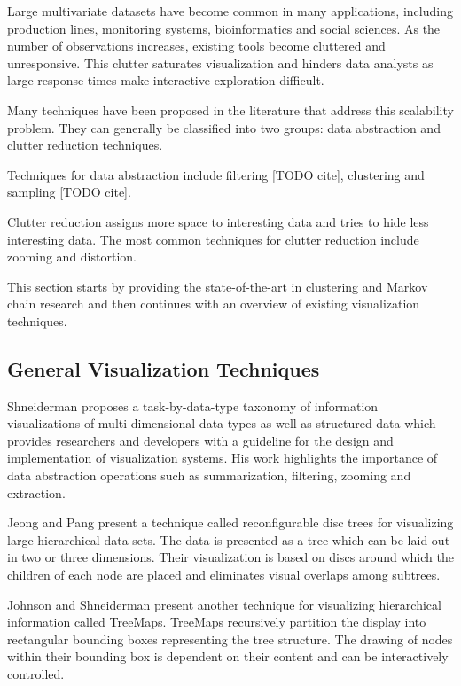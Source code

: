 Large multivariate datasets have become common in many applications, including production lines,
monitoring systems, bioinformatics and social sciences. As the number of observations increases,
existing tools become cluttered and unresponsive. This clutter saturates visualization and hinders
data analysts as large response times make interactive exploration difficult.

Many techniques have been proposed in the literature that address this scalability problem.
They can generally be classified into two groups: data abstraction and clutter reduction 
techniques.

Techniques for data abstraction include filtering [TODO cite], clustering
and sampling [TODO cite].

Clutter reduction assigns more space to interesting data and tries to hide less interesting data.
The most common techniques for clutter reduction include zooming and distortion.

This section starts by providing the state-of-the-art in clustering and Markov chain research and
then continues with an overview of existing visualization techniques.

\subsection{General Visualization Techniques}

Shneiderman \cite{545307} proposes a task-by-data-type taxonomy of information visualizations of multi-dimensional
data types as well as structured data which provides researchers and developers with a guideline for
the design and implementation of visualization systems. His work highlights the importance of data
abstraction operations such as summarization, filtering, zooming and extraction.

Jeong and Pang \cite{729555} present a technique called reconfigurable disc trees for visualizing large 
hierarchical data sets. The data is presented as a tree which can be laid out in two or three dimensions.
Their visualization is based on discs around which the children of each node are placed and eliminates
visual overlaps among subtrees.

Johnson and Shneiderman \cite{Johnson:1991:TSA:949607.949654} present another technique for visualizing hierarchical
information called TreeMaps. TreeMaps recursively partition the display into rectangular bounding boxes representing the 
tree structure. The drawing of nodes within their bounding box is dependent on their content and can be interactively
controlled.

